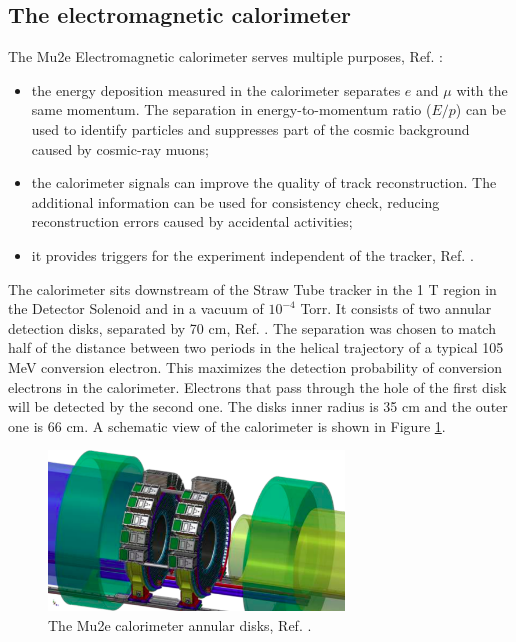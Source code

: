 \subsection{The electromagnetic calorimeter}\label{calorimeter}
The Mu2e Electromagnetic calorimeter serves multiple purposes, Ref. \cite{em4}:
\begin{itemize}
    \item the energy deposition measured in the calorimeter separates $e$ and $\mu$ with the same momentum.
    The separation in energy-to-momentum ratio ($E/p$) can be used to identify particles and suppresses
    part of the cosmic background caused by cosmic-ray muons;
    \item the calorimeter signals can improve the quality of track reconstruction. The additional information can
    be used for consistency check, reducing reconstruction errors caused by accidental activities;
    \item it provides triggers for the experiment independent of the tracker, Ref. \cite{em6}. 
\end{itemize} 
The calorimeter sits downstream of the Straw Tube tracker in the 1 T region in the Detector Solenoid and in a vacuum of $10^{-4}$ Torr. 
It consists of two annular detection disks, separated by 70 cm, Ref. \cite{em7}. 
The separation was chosen to match half of the distance between two periods in the helical trajectory of a
typical 105 MeV conversion electron. This maximizes the detection probability of conversion electrons in the
calorimeter. Electrons that pass through the hole of the first disk will be detected by the second one.
The disks inner radius is 35 cm and the outer one is 66 cm. A schematic view of the calorimeter is shown in Figure \ref{fig:calo1}.
\begin{figure}[!h]
    \centering
    \includegraphics[width =0.7\textwidth]{figures/png/Screenshot_20240322_122050.png}
    \caption{The Mu2e calorimeter annular disks, Ref. \cite{em7}.}
    \label{fig:calo1}
\end{figure}
